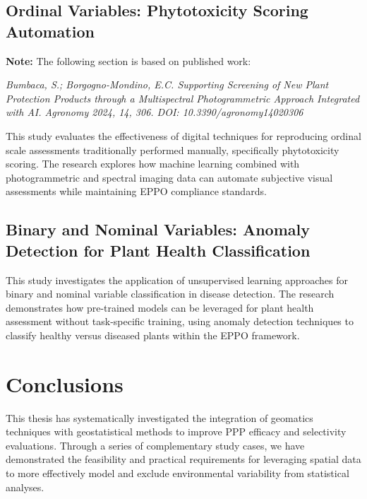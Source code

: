 \documentclass[12pt,a4paper,oneside]{report}
\begin{document}
\section{Ordinal Variables: Phytotoxicity Scoring Automation}

\textbf{Note:} The following section is based on published work:

\textit{Bumbaca, S.; Borgogno-Mondino, E.C. Supporting Screening of New Plant Protection Products through a Multispectral Photogrammetric Approach Integrated with AI. Agronomy 2024, 14, 306. DOI: 10.3390/agronomy14020306}

This study evaluates the effectiveness of digital techniques for reproducing ordinal scale assessments traditionally performed manually, specifically phytotoxicity scoring. The research explores how machine learning combined with photogrammetric and spectral imaging data can automate subjective visual assessments while maintaining EPPO compliance standards.





\section{Binary and Nominal Variables: Anomaly Detection for Plant Health Classification}

This study investigates the application of unsupervised learning approaches for binary and nominal variable classification in disease detection. The research demonstrates how pre-trained models can be leveraged for plant health assessment without task-specific training, using anomaly detection techniques to classify healthy versus diseased plants within the EPPO framework.



\chapter{Conclusions}

This thesis has systematically investigated the integration of geomatics techniques 
with geostatistical methods to improve PPP efficacy and selectivity evaluations. 
Through a series of complementary study cases, we have demonstrated the feasibility 
and practical requirements for leveraging spatial data to more effectively model 
and exclude environmental variability from statistical analyses.
\end{document}
